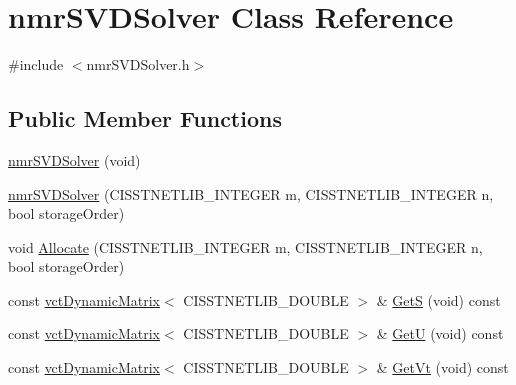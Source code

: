 \hypertarget{classnmr_s_v_d_solver}{}\section{nmr\+S\+V\+D\+Solver Class Reference}
\label{classnmr_s_v_d_solver}


{\ttfamily \#include $<$nmr\+S\+V\+D\+Solver.\+h$>$}

\subsection*{Public Member Functions}
\begin{DoxyCompactItemize}
\item 
\hyperlink{classnmr_s_v_d_solver_a0c735069bd7aad7dc6bd1fcf422fbcde}{nmr\+S\+V\+D\+Solver} (void)
\item 
\hyperlink{classnmr_s_v_d_solver_a5ab036be000c8d440bb0ee0943b2990d}{nmr\+S\+V\+D\+Solver} (C\+I\+S\+S\+T\+N\+E\+T\+L\+I\+B\+\_\+\+I\+N\+T\+E\+G\+E\+R m, C\+I\+S\+S\+T\+N\+E\+T\+L\+I\+B\+\_\+\+I\+N\+T\+E\+G\+E\+R n, bool storage\+Order)
\item 
void \hyperlink{classnmr_s_v_d_solver_af32d34f0fc16618b2b0658b198d2dd85}{Allocate} (C\+I\+S\+S\+T\+N\+E\+T\+L\+I\+B\+\_\+\+I\+N\+T\+E\+G\+E\+R m, C\+I\+S\+S\+T\+N\+E\+T\+L\+I\+B\+\_\+\+I\+N\+T\+E\+G\+E\+R n, bool storage\+Order)
\item 
const \hyperlink{classvct_dynamic_matrix}{vct\+Dynamic\+Matrix}$<$ C\+I\+S\+S\+T\+N\+E\+T\+L\+I\+B\+\_\+\+D\+O\+U\+B\+L\+E $>$ \& \hyperlink{classnmr_s_v_d_solver_aef9dd9baa625aadc95244c5b8c5757c6}{Get\+S} (void) const 
\item 
const \hyperlink{classvct_dynamic_matrix}{vct\+Dynamic\+Matrix}$<$ C\+I\+S\+S\+T\+N\+E\+T\+L\+I\+B\+\_\+\+D\+O\+U\+B\+L\+E $>$ \& \hyperlink{classnmr_s_v_d_solver_a06ca9479cd377c3edee5286aa46634e9}{Get\+U} (void) const 
\item 
const \hyperlink{classvct_dynamic_matrix}{vct\+Dynamic\+Matrix}$<$ C\+I\+S\+S\+T\+N\+E\+T\+L\+I\+B\+\_\+\+D\+O\+U\+B\+L\+E $>$ \& \hyperlink{classnmr_s_v_d_solver_a919c907c6377331cf1a1a8d1a5085940}{Get\+Vt} (void) const 
\end{DoxyCompactItemize}
